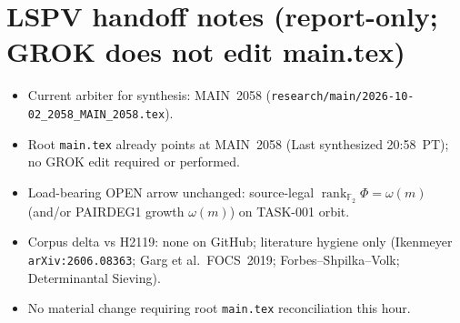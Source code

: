 \documentclass[11pt]{article}
\begin{document}
\section*{LSPV handoff notes (report-only; GROK does not edit main.tex)}
\begin{itemize}
\item Current arbiter for synthesis: MAIN~2058
(\texttt{research/main/2026-10-02\_2058\_MAIN\_2058.tex}).
\item Root \texttt{main.tex} already points at MAIN~2058 (Last synthesized
20:58~PT); no GROK edit required or performed.
\item Load-bearing OPEN arrow unchanged: source-legal
$\operatorname{rank}_{\mathbb F_2}\Phi=\omega(m)$ (and/or PAIRDEG1 growth
$\omega(m)$) on TASK-001 orbit.
\item Corpus delta vs H2119: none on GitHub; literature hygiene only
(Ikenmeyer \texttt{arXiv:2606.08363}; Garg et al.\ FOCS~2019;
Forbes--Shpilka--Volk; Determinantal Sieving).
\item No material change requiring root \texttt{main.tex} reconciliation this
hour.
\end{itemize}

\end{document}
